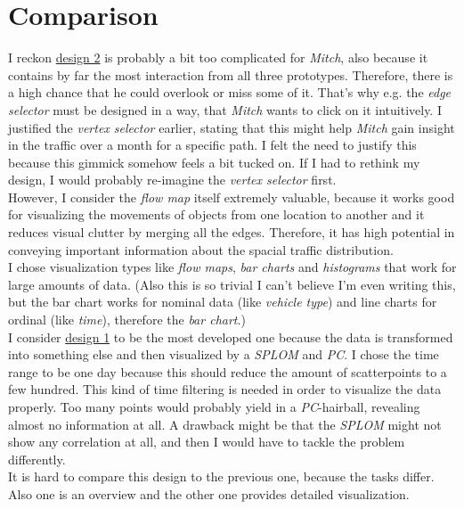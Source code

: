 \documentclass{article}
\begin{document}
\section{Comparison}
I reckon \hyperref[fig:design2]{design 2} is probably a bit too complicated for \textit{Mitch}, also because it contains by far the most interaction from all three prototypes. Therefore, there is a high chance that he could overlook or miss some of it. That's why e.g. the \textit{edge selector} must be designed in a way, that \textit{Mitch} wants to click on it intuitively. I justified the \textit{vertex selector} earlier, stating that this might help \textit{Mitch} gain insight in the traffic over a month for a specific path. I felt the need to justify this because this gimmick somehow feels a bit tucked on. If I had to rethink my design, I would probably re-imagine the \textit{vertex selector} first.\\
However, I consider the \textit{flow map} itself extremely valuable, because it works good for visualizing the movements of objects from one location to another and it reduces visual clutter by merging all the edges. Therefore, it has high potential in conveying important information about the spacial traffic distribution.\\
I chose visualization types like \textit{flow maps}, \textit{bar charts} and \textit{histograms} that work for large amounts of data. (Also this is so trivial I can't believe I'm even writing this, but the bar chart works for nominal data (like \textit{vehicle type}) and line charts for ordinal (like \textit{time}), therefore the \textit{bar chart}.)\\

I consider \hyperref[fig:design1]{design 1} to be the most developed one because the data is transformed into something else and then visualized by a \textit{SPLOM} and \textit{PC}. I chose the time range to be one day because this should reduce the amount of scatterpoints to a few hundred. This kind of time filtering is needed in order to visualize the data properly. Too many points would probably yield in a \textit{PC}-hairball, revealing almost no information at all. A drawback might be that the \textit{SPLOM} might not show any correlation at all, and then I would have to tackle the problem differently.\\
It is hard to compare this design to the previous one, because the tasks differ. Also one is an overview and the other one provides detailed visualization.\\
\end{document}
